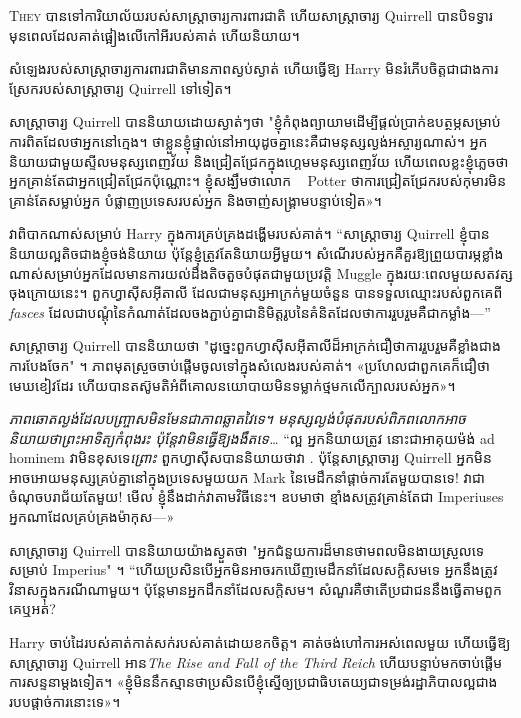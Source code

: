 
\lettrine{T}{hey} បានទៅការិយាល័យរបស់សាស្ត្រាចារ្យការពារជាតិ ហើយសាស្រ្តាចារ្យ Quirrell បានបិទទ្វារ មុនពេលដែលគាត់ផ្អៀងលើកៅអីរបស់គាត់ ហើយនិយាយ។

សំឡេង​របស់​សាស្ត្រាចារ្យ​ការពារ​ជាតិ​មាន​ភាព​ស្ងប់​ស្ងាត់ ហើយ​ធ្វើ​ឱ្យ Harry មិន​រំភើប​ចិត្ត​ជា​ជាង​ការ​ស្រែក​របស់​សាស្ត្រាចារ្យ Quirrell ទៅ​ទៀត។

សាស្ត្រាចារ្យ Quirrell បាននិយាយដោយស្ងាត់ៗថា "ខ្ញុំកំពុងព្យាយាមដើម្បីផ្តល់ប្រាក់ឧបត្ថម្ភសម្រាប់ការពិតដែលថាអ្នកនៅក្មេង។ ថា​ខ្លួន​ខ្ញុំ​ផ្ទាល់​នៅ​អាយុ​ដូច​គ្នា​នេះ​គឺ​ជា​មនុស្ស​ល្ងង់​អស្ចារ្យ​ណាស់​។ អ្នកនិយាយជាមួយស្ទីលមនុស្សពេញវ័យ និងជ្រៀតជ្រែកក្នុងហ្គេមមនុស្សពេញវ័យ ហើយពេលខ្លះខ្ញុំភ្លេចថាអ្នកគ្រាន់តែជាអ្នកជ្រៀតជ្រែកប៉ុណ្ណោះ។ ខ្ញុំសង្ឃឹមថាលោក ~ Potter ថាការជ្រៀតជ្រែករបស់កុមារមិនគ្រាន់តែសម្លាប់អ្នក បំផ្លាញប្រទេសរបស់អ្នក និងចាញ់សង្រ្គាមបន្ទាប់ទៀត»។

វាពិបាកណាស់សម្រាប់ Harry ក្នុងការគ្រប់គ្រងដង្ហើមរបស់គាត់។ “សាស្រ្តាចារ្យ Quirrell ខ្ញុំបាននិយាយល្អតិចជាងខ្ញុំចង់និយាយ ប៉ុន្តែខ្ញុំត្រូវតែនិយាយអ្វីមួយ។ សំណើរបស់អ្នកគឺគួរឱ្យព្រួយបារម្ភខ្លាំងណាស់សម្រាប់អ្នកដែលមានការយល់ដឹងតិចតួចបំផុតជាមួយប្រវត្តិ Muggle ក្នុងរយៈពេលមួយសតវត្សចុងក្រោយនេះ។ ពួកហ្វាស៊ីសអ៊ីតាលី ដែលជាមនុស្សអាក្រក់មួយចំនួន បានទទួលឈ្មោះរបស់ពួកគេពី \emph{fasces} ដែលជាបណ្តុំនៃកំណាត់ដែលចងភ្ជាប់គ្នាជានិមិត្តរូបនៃគំនិតដែលថាការរួបរួមគឺជាកម្លាំង—”

សាស្រ្តាចារ្យ Quirrell បាននិយាយថា "ដូច្នេះពួកហ្វាស៊ីសអ៊ីតាលីដ៏អាក្រក់ជឿថាការរួបរួមគឺខ្លាំងជាងការបែងចែក" ។ ភាពមុតស្រួចចាប់ផ្តើមចូលទៅក្នុងសំលេងរបស់គាត់។ «ប្រហែល​ជា​ពួក​គេ​ក៏​ជឿ​ថា​មេឃ​ខៀវ​ដែរ ហើយ​បាន​តស៊ូ​មតិ​អំពី​គោល​នយោបាយ​មិន​ទម្លាក់​ថ្ម​មក​លើ​ក្បាល​របស់​អ្នក»។

\emph{ភាពឆោតល្ងង់ដែលបញ្ច្រាសមិនមែនជាភាពឆ្លាតវៃទេ។ មនុស្សល្ងង់បំផុតរបស់ពិភពលោកអាចនិយាយថាព្រះអាទិត្យកំពុងរះ ប៉ុន្តែវាមិនធ្វើឱ្យងងឹតទេ…} “ល្អ អ្នកនិយាយត្រូវ នោះជាអាគុយម៉ង់ ad hominem វាមិនខុសទេ\emph{ព្រោះ} ពួកហ្វាស៊ីសបាននិយាយថាវា . ប៉ុន្តែសាស្រ្តាចារ្យ Quirrell អ្នកមិនអាចអោយមនុស្សគ្រប់គ្នានៅក្នុងប្រទេសមួយយក Mark នៃមេដឹកនាំផ្តាច់ការតែមួយបានទេ! វាជាចំណុចបរាជ័យតែមួយ! មើល ខ្ញុំនឹងដាក់វាតាមវិធីនេះ។ ឧបមាថា ខ្មាំងសត្រូវគ្រាន់តែជា Imperiuses អ្នកណាដែលគ្រប់គ្រងម៉ាកុស—»

សាស្ត្រាចារ្យ Quirrell បាននិយាយយ៉ាងស្ងួតថា "អ្នកជំនួយការដ៏មានថាមពលមិនងាយស្រួលទេសម្រាប់ Imperius" ។ “ហើយ​ប្រសិន​បើ​អ្នក​មិន​អាច​រក​ឃើញ​មេដឹកនាំ​ដែល​សក្ដិសម​ទេ អ្នក​នឹង​ត្រូវ​វិនាស​ក្នុង​ករណី​ណា​មួយ​។ ប៉ុន្តែមានអ្នកដឹកនាំដែលសក្តិសម។ សំណួរគឺថាតើប្រជាជននឹងធ្វើតាមពួកគេឬអត់?

Harry ចាប់ដៃរបស់គាត់កាត់សក់របស់គាត់ដោយខកចិត្ត។ គាត់ចង់ហៅការអស់ពេលមួយ ហើយធ្វើឱ្យសាស្រ្តាចារ្យ Quirrell អាន\emph{The Rise and Fall of the Third Reich} ហើយបន្ទាប់មកចាប់ផ្តើមការសន្ទនាម្តងទៀត។ «ខ្ញុំ​មិន​នឹក​ស្មាន​ថា​ប្រសិន​បើ​ខ្ញុំ​ស្នើ​ឲ្យ​ប្រជាធិបតេយ្យ​ជា​ទម្រង់​រដ្ឋាភិបាល​ល្អ​ជាង​របប​ផ្តាច់ការ​នោះ​ទេ»។

